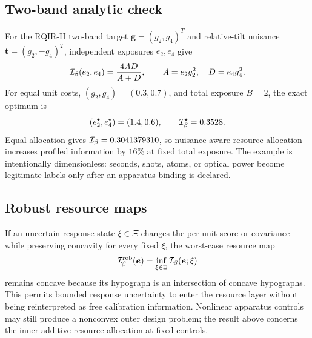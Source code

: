 \subsection{Two-band analytic check}

For the RQIR-II two-band target $\bm g=(g_2,g_4)^T$ and relative-tilt nuisance $\bm t=(g_2,-g_4)^T$, independent exposures $e_2,e_4$ give
\begin{equation}
\mathcal I_{\beta}(e_2,e_4)=\frac{4AD}{A+D},\qquad
A=e_2g_2^2,\quad D=e_4g_4^2.
\label{eq:twoband}
\end{equation}
For equal unit costs, $(g_2,g_4)=(0.3,0.7)$, and total exposure $B=2$, the exact optimum is
\begin{equation}
(e_2^\star,e_4^\star)=(1.4,0.6),\qquad
\mathcal I_{\beta}^\star=0.3528.
\end{equation}
Equal allocation gives $\mathcal I_{\beta}=0.3041379310$, so nuisance-aware resource allocation increases profiled information by $16\%$ at fixed total exposure. The example is intentionally dimensionless: seconds, shots, atoms, or optical power become legitimate labels only after an apparatus binding is declared.

\subsection{Robust resource maps}

If an uncertain response state $\xi\in\Xi$ changes the per-unit score or covariance while preserving concavity for every fixed $\xi$, the worst-case resource map
\begin{equation}
\mathcal I_{\beta}^{\rm rob}(\bm e)=\inf_{\xi\in\Xi}\mathcal I_{\beta}(\bm e;\xi)
\end{equation}
remains concave because its hypograph is an intersection of concave hypographs. This permits bounded response uncertainty to enter the resource layer without being reinterpreted as free calibration information. Nonlinear apparatus controls may still produce a nonconvex outer design problem; the result above concerns the inner additive-resource allocation at fixed controls.
